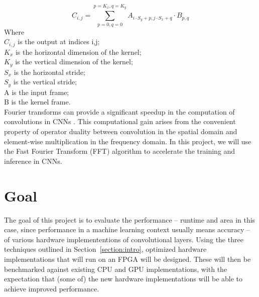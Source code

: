 \documentclass[conference,compsoc]{IEEEtran/IEEEtran}
\begin{document}
\begin{equation}\label{eq:conv}
C_{i,j} = \sum_{p=0,q=0}^{p=K_x,q=K_y}A_{i\cdot S_y + p, j\cdot S_x + q}\cdot B_{p,q} 
\end{equation}
Where\\ 
\hspace*{2em} $C_{i,j}$ is the output at indices i,j;\\
\hspace*{2em} $K_x$ is the horizontal dimension of the kernel;\\
\hspace*{2em} $K_y$ is the vertical dimension of the kernel;\\
\hspace*{2em} $S_x$ is the horizontal stride;\\
\hspace*{2em} $S_y$ is the vertical stride;\\
\hspace*{2em} A is the input frame;\\
\hspace*{2em} B is the kernel frame.\\


Fourier transforms can provide a significant speedup in the computation of convolutions in CNNs \cite{FFT1, FFT2}. This computational gain arises from the convenient property of operator duality between convolution in the spatial domain and element-wise multiplication in the frequency domain. In this project, we will use the Fast Fourier Transform (FFT) algorithm to accelerate the training and inference in CNNs.


\section{Goal}\label{section:goal}

The goal of this project is to evaluate the performance -- runtime and area in this case, since performance in a machine learning context usually means accuracy -- of various hardware implemententions of convolutional layers.
Using the three techniques outlined in Section~\ref{section:intro}, optimized hardware implementations that will run on an FPGA will be designed.
These will then be benchmarked against existing CPU and GPU implementations, with the expectation that (some of) the new hardware implementations will be able to achieve improved performance.
\end{document}
